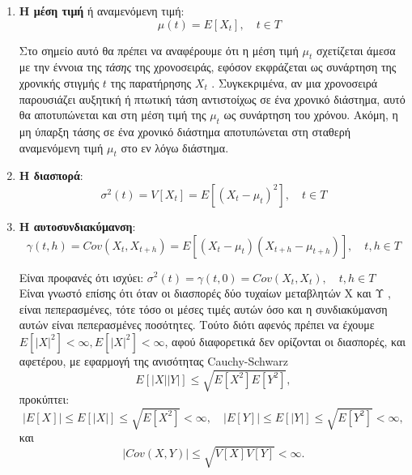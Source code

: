 \begin{enumerate}


\item \textbf{Η μέση τιμή } ή αναμενόμενη τιμή:\\ $$\quad \mu\left( t  \right) = E\left[ X_t \right], \quad t \in T $$

Στο σημείο αυτό θα πρέπει να αναφέρουμε ότι η μέση τιμή $\mu_t$ σχετίζεται άμεσα
με την έννοια της \textit{τάσης} της χρονοσειράς, εφόσον εκφράζεται ως συνάρτηση της
χρονικής στιγμής $t$ της παρατήρησης $X_t$ . Συγκεκριμένα, αν μια χρονοσειρά παρουσιάζει
αυξητική ή πτωτική τάση αντιστοίχως σε ένα χρονικό διάστημα, αυτό θα αποτυπώνεται
και στη μέση τιμή της $\mu_t$ ως συνάρτηση του χρόνου. Ακόμη, η μη ύπαρξη τάσης σε ένα
χρονικό διάστημα αποτυπώνεται στη σταθερή αναμενόμενη τιμή $\mu_t$ στο εν λόγω
διάστημα.

\item \textbf{Η διασπορά}:\\ $$\sigma^2\left( t \right) =V \left[X_t \right] = E\left[\left( X_t-\mu_t\right) ^2  \right], \quad t \in T    $$

\item \textbf{Η αυτοσυνδιακύμανση}:\\
$$ \gamma\left(t,h \right) = Cov\left(X_t,X_{t+h} \right) =E\left[ \left(X_t-\mu_t \right)\left( X_{t+h}-\mu_{t+h}\right)  \right], \quad t,h \in T   $$ 

Είναι προφανές ότι ισχύει: 
$\sigma^2\left( t \right)=\gamma\left( t,0\right) =Cov\left(X_t,X_t \right),\quad t,h \in T   $ \\
Είναι γνωστό επίσης ότι όταν οι διασπορές δύο τυχαίων μεταβλητών Χ και Υ , είναι
πεπερασμένες, τότε τόσο οι μέσες τιμές αυτών όσο και η συνδιακύμανση αυτών
είναι πεπερασμένες ποσότητες. Τούτο διότι αφενός πρέπει να έχουμε\\
$E \left[ \vert X \vert ^2 \right]< ∞ , E \left[ \vert X \vert ^2 \right] < ∞ $, αφού διαφορετικά δεν ορίζονται οι διασπορές, και αφετέρου,
με εφαρμογή της ανισότητας Cauchy-Schwarz\\
$$E \left[\vert X \vert\vert Y \vert \right] \leq \sqrt{ E \left[ X^2 \right] E \left[ Y^2 \right]}, $$
προκύπτει:\\
$$\vert E \left[ X \right] \vert \leq E \left[\vert X \vert \right] \leq \sqrt{ E \left[ X^ 2 \right]} < ∞ , \quad \vert E \left[ Y \right] \vert \leq E \left[\vert Y \vert\right] \leq \sqrt{ E \left[ Y^ 2 \right]} < ∞  ,$$
και
$$ \vert Cov \left( X , Y \right) \vert \leq \sqrt{ V \left[ X \right] V \left[ Y \right]} < ∞ .$$


\end{enumerate}

